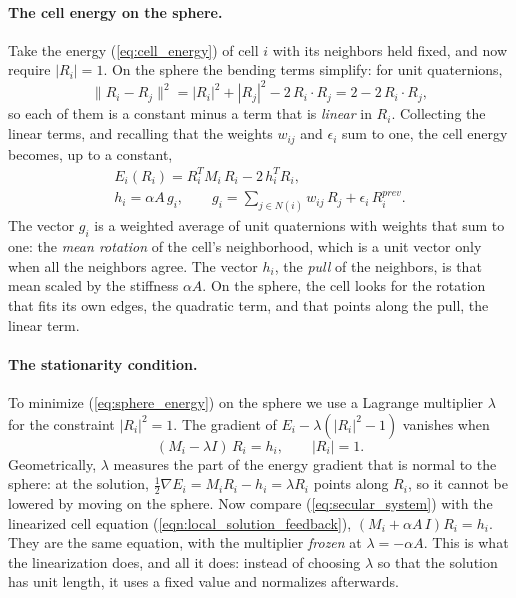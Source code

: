 \documentclass{birkjour}
\theoremstyle{remark}
\numberwithin{equation}{section}
\begin{document}
\paragraph{The cell energy on the sphere.} Take the energy (\ref{eq:cell_energy}) of cell $i$ with its neighbors held fixed, and now require $|R_i| = 1$. On the sphere the bending terms simplify: for unit quaternions,
\begin{equation*}
\| R_i - R_j \|^2 = |R_i|^2 + |R_j|^2 - 2 \, R_i \cdot R_j = 2 - 2 \, R_i \cdot R_j ,
\end{equation*}
so each of them is a constant minus a term that is \emph{linear} in $R_i$. Collecting the linear terms, and recalling that the weights $w_{ij}$ and $\epsilon_i$ sum to one, the cell energy becomes, up to a constant,
\begin{equation}
\label{eq:sphere_energy}
\begin{gathered}
E_i(R_i) = R_i^T M_i \, R_i - 2 \, h_i^T R_i ,
\\
h_i = \alpha A \, g_i, \qquad g_i = \sum_{j \in N(i)} w_{ij} \, R_j + \epsilon_i \, R^{prev}_i .
\end{gathered}
\end{equation}
The vector $g_i$ is a weighted average of unit quaternions with weights that sum to one: the \emph{mean rotation} of the cell's neighborhood, which is a unit vector only when all the neighbors agree. The vector $h_i$, the \emph{pull} of the neighbors, is that mean scaled by the stiffness $\alpha A$. On the sphere, the cell looks for the rotation that fits its own edges, the quadratic term, and that points along the pull, the linear term.

\paragraph{The stationarity condition.} To minimize (\ref{eq:sphere_energy}) on the sphere we use a Lagrange multiplier $\lambda$ for the constraint $|R_i|^2 = 1$. The gradient of $E_i - \lambda (|R_i|^2 - 1)$ vanishes when
\begin{equation}
\label{eq:secular_system}
(M_i - \lambda I) \, R_i = h_i , \qquad |R_i| = 1 .
\end{equation}
Geometrically, $\lambda$ measures the part of the energy gradient that is normal to the sphere: at the solution, $\frac12 \nabla E_i = M_i R_i - h_i = \lambda R_i$ points along $R_i$, so it cannot be lowered by moving on the sphere. Now compare (\ref{eq:secular_system}) with the linearized cell equation (\ref{eqn:local_solution_feedback}), $(M_i + \alpha A \, I) R_i = h_i$. They are the same equation, with the multiplier \emph{frozen} at $\lambda = -\alpha A$. This is what the linearization does, and all it does: instead of choosing $\lambda$ so that the solution has unit length, it uses a fixed value and normalizes afterwards.
\end{document}
